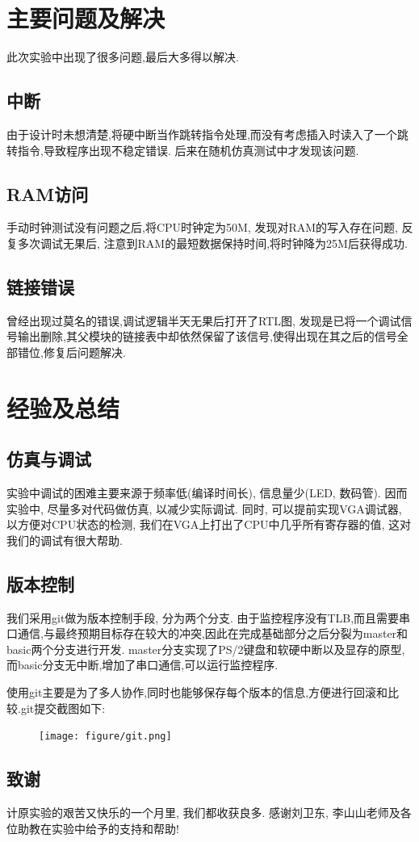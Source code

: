 \section{主要问题及解决}
此次实验中出现了很多问题,最后大多得以解决.
\subsection{中断}
由于设计时未想清楚,将硬中断当作跳转指令处理,而没有考虑插入时读入了一个跳转指令,导致程序出现不稳定错误.
后来在随机仿真测试中才发现该问题.
\subsection{RAM访问}
手动时钟测试没有问题之后,将CPU时钟定为50M,
发现对RAM的写入存在问题,
反复多次调试无果后, 注意到RAM的最短数据保持时间,将时钟降为25M后获得成功.
\subsection{链接错误}
曾经出现过莫名的错误,调试逻辑半天无果后打开了RTL图,
发现是已将一个调试信号输出删除,其父模块的链接表中却依然保留了该信号,使得出现在其之后的信号全部错位,修复后问题解决.

\section{经验及总结}
\subsection{仿真与调试}
  实验中调试的困难主要来源于频率低(编译时间长), 信息量少(LED, 数码管).
  因而实验中, 尽量多对代码做仿真, 以减少实际调试.
  同时, 可以提前实现VGA调试器, 以方便对CPU状态的检测, 我们在VGA上打出了CPU中几乎所有寄存器的值,
  这对我们的调试有很大帮助.

\subsection{版本控制}
我们采用git做为版本控制手段, 分为两个分支.
由于监控程序没有TLB,而且需要串口通信,与最终预期目标存在较大的冲突,因此在完成基础部分之后分裂为master和basic两个分支进行开发.
master分支实现了PS/2键盘和软硬中断以及显存的原型,而basic分支无中断,增加了串口通信,可以运行监控程序.

使用git主要是为了多人协作,同时也能够保存每个版本的信息,方便进行回滚和比较.git提交截图如下:
\begin{figure}[H]
  \centering
  \texttt{[image: figure/git.png]}
\end{figure}


\subsection{致谢}
计原实验的艰苦又快乐的一个月里, 我们都收获良多.
感谢刘卫东, 李山山老师及各位助教在实验中给予的支持和帮助!

